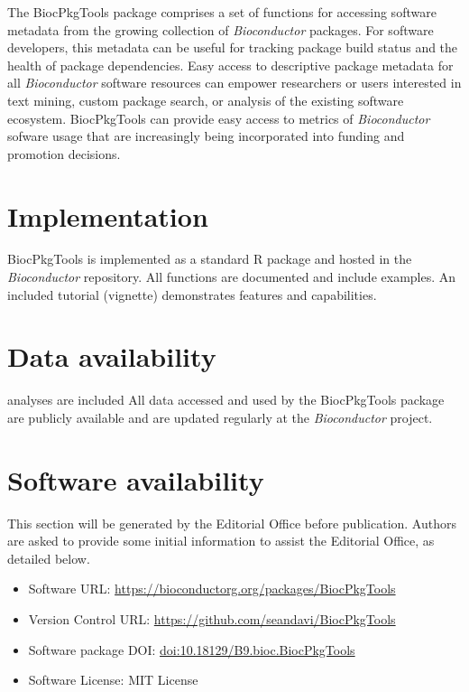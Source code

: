 \documentclass[9pt,a4paper]{extarticle}\usepackage[]{graphicx}\usepackage[]{color}
\begin{document}
The BiocPkgTools package comprises a set of functions for accessing
software metadata from the growing collection of \emph{Bioconductor}
packages. For software developers, this metadata can be useful for
tracking package build status and the health of package dependencies.
Easy access to descriptive package metadata for all
\emph{Bioconductor} software resources can empower researchers or
users interested in text mining, custom package search, or analysis of
the existing software ecosystem. BiocPkgTools can provide easy access
to metrics of \emph{Bioconductor} sofware usage that are increasingly
being incorporated into funding and promotion decisions.

\section*{Implementation}

BiocPkgTools is implemented as a standard R package and hosted in the
\emph{Bioconductor} repository. All functions are documented and include
examples. An included tutorial (vignette) demonstrates features and
capabilities.

\section*{Data availability} %
analyses are included All data accessed and used by the BiocPkgTools
package are publicly available and are updated regularly at the
\emph{Bioconductor} project.

\section*{Software availability}
This section will be generated by the Editorial Office before publication. Authors are asked to provide some initial information to assist the Editorial Office, as detailed below.
\begin{itemize}
\item Software URL: \href{https://bioconductor.org/packages/BiocPkgTools}{https://bioconductorg.org/packages/BiocPkgTools}
\item Version Control URL: \href{https://github.com/seandavi/BiocPkgTools}{https://github.com/seandavi/BiocPkgTools}
\item Software package DOI: \href{https://doi.org/doi:10.18129/B9.bioc.BiocPkgTools}{doi:10.18129/B9.bioc.BiocPkgTools}
\item Software License: MIT License
\end{itemize}
\end{document}
